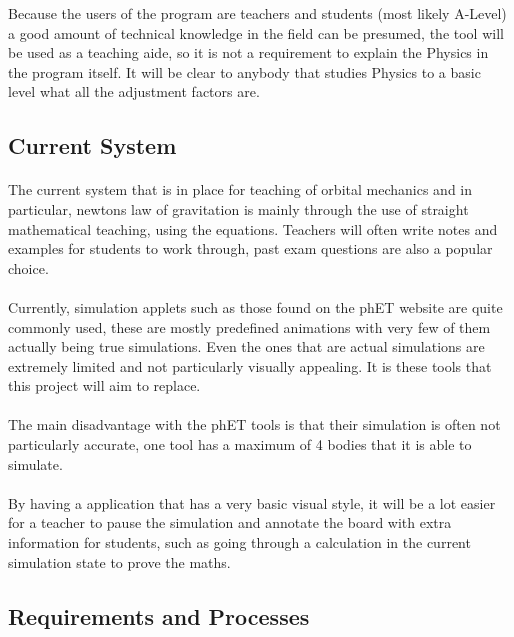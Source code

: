 Because the users of the program are teachers and students (most likely A-Level) a good amount of technical knowledge in the field can be presumed, the tool will be used as a teaching aide, so it is not a requirement to explain the Physics in the program itself. It will be clear to anybody that studies Physics to a basic level what all the adjustment factors are.

\subsection{Current System}
\paragraph{}
The current system that is in place for teaching of orbital mechanics and in particular, newtons law of gravitation is mainly through the use of straight mathematical teaching, using the equations. Teachers will often write notes and examples for students to work through, past exam questions are also a popular choice.

\paragraph{}
Currently, simulation applets such as those found on the phET website are quite commonly used, these are mostly predefined animations with very few of them actually being true simulations.
Even the ones that are actual simulations are extremely limited and not particularly visually appealing. It is these tools that this project will aim to replace.

\paragraph{}
The main disadvantage with the phET tools is that their simulation is often not particularly accurate, one tool has a maximum of 4 bodies that it is able to simulate.

\paragraph{}
By having a application that has a very basic visual style, it will be a lot easier for a teacher to pause the simulation and annotate the board with extra information for students, such as going through a calculation in the current simulation state to prove the maths.

\subsection{Requirements and Processes}
